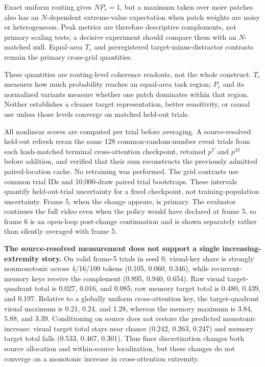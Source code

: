 \documentclass[10pt]{article}
\begin{document}
Exact uniform routing gives $NP_r=1$, but a maximum taken over more patches also has an $N$-dependent extreme-value expectation when patch weights are noisy or heterogeneous. Peak metrics are therefore descriptive complements, not primary scaling tests; a decisive experiment should compare them with an $N$-matched null. Equal-area $T_r$ and preregistered target-minus-distractor contrasts remain the primary cross-grid quantities.

These quantities are routing-level coherence readouts, not the whole construct. $T_r$ measures how much probability reaches an equal-area task region; $P_r$ and its normalized variants measure whether one patch dominates within that region. Neither establishes a cleaner target representation, better sensitivity, or causal use unless those levels converge on matched held-out trials.

All nonlinear scores are computed per trial before averaging. A source-resolved held-out refresh reran the same 128 common-random-number event trials from each hash-matched terminal cross-attention checkpoint, retained $p^V$ and $p^M$ before addition, and verified that their sum reconstructs the previously admitted paired-location cache. No retraining was performed. The grid contrasts use common trial IDs and 10{,}000-draw paired trial bootstraps. These intervals quantify held-out-trial uncertainty for a fixed checkpoint, not training-population uncertainty. Frame 5, when the change appears, is primary. The evaluator continues the full video even when the policy would have declared at frame 5, so frame 6 is an open-loop post-change continuation and is shown separately rather than silently averaged with frame 5.

\textbf{The source-resolved measurement does not support a single increasing-extremity story.} On valid frame-5 trials in seed 0, visual-key share is strongly nonmonotonic across 4/16/100 tokens (0.105, 0.060, 0.346), while recurrent-memory keys receive the complement (0.895, 0.940, 0.654). Raw visual target-quadrant total is 0.027, 0.016, and 0.085; raw memory target total is 0.480, 0.439, and 0.197. Relative to a globally uniform cross-attention key, the target-quadrant visual maximum is 0.21, 0.24, and 1.28, whereas the memory maximum is 3.84, 5.88, and 3.39. Conditioning on source does not restore the predicted monotonic increase: visual target total stays near chance (0.242, 0.263, 0.247) and memory target total falls (0.533, 0.467, 0.301). Thus finer discretization changes both source allocation and within-source localization, but these changes do not converge on a monotonic increase in cross-attention extremity.
\end{document}
